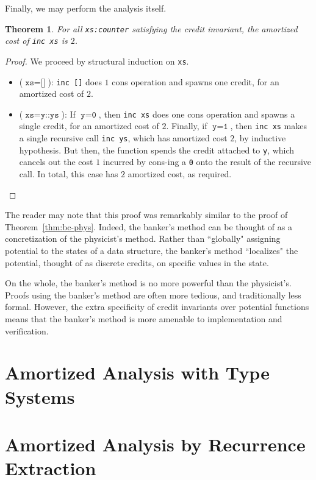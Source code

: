 \documentclass[draft]{westhesis}
\newtheorem{theorem}{Theorem}[section]
\begin{document}
Finally, we may perform the analysis itself.

\begin{theorem}
For all \texttt{xs:counter} satisfying the credit invariant, the amortized cost of \texttt{inc xs} is $2$.
\end{theorem}
\begin{proof}
We proceed by structural induction on \texttt{xs}.
\begin{itemize}
  \item ($\texttt{xs} = \texttt{[]}$): \texttt{inc []} does $1$ cons operation and spawns one credit, for an amortized cost of $2$.
  \item ($\texttt{xs} = \texttt{y::ys}$): If $\texttt{y} = \texttt{0}$, then \texttt{inc xs} does one cons operation and spawns a single credit, for an amortized cost of $2$. Finally, if $\texttt{y} = \texttt{1}$, then \texttt{inc xs} makes a single recursive call \texttt{inc ys}, which has amortized cost $2$, by inductive hypothesis. But then, the function spends the credit attached to \texttt{y}, which cancels out the cost $1$ incurred by cons-ing a \texttt{0} onto the result of the recursive call. In total, this case has $2$ amortized cost, as required.
\end{itemize}
\end{proof}

The reader may note that this proof was remarkably similar to the proof of Theorem~\ref{thm:bc-phys}. Indeed, the banker's method can be thought of as a concretization of the physicist's method. Rather than ``globally" assigning potential to the states of a data structure, the banker's method ``localizes" the potential, thought of as discrete credits, on  specific values in the state.

On the whole, the banker's method is no more powerful than the physicist's. Proofs using the banker's method are often more tedious, and traditionally less formal. However, the extra specificity of credit invariants over potential functions means that the banker's method is more amenable to implementation and verification. 

\chapter{Amortized Analysis with Type Systems}


\chapter{Amortized Analysis by Recurrence Extraction} 




\end{document}
